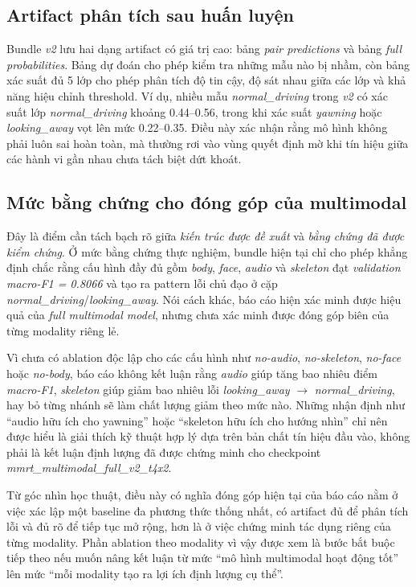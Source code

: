 \documentclass[conference,a4paper]{IEEEtran}
\begin{document}
\subsection{Artifact phân tích sau huấn luyện}
Bundle \textit{v2} lưu hai dạng artifact có giá trị cao: bảng \textit{pair predictions} và bảng \textit{full probabilities}. Bảng dự đoán cho phép kiểm tra những mẫu nào bị nhầm, còn bảng xác suất đủ 5 lớp cho phép phân tích độ tin cậy, độ sát nhau giữa các lớp và khả năng hiệu chỉnh threshold. Ví dụ, nhiều mẫu \textit{normal\_driving} trong \textit{v2} có xác suất lớp \textit{normal\_driving} khoảng 0.44--0.56, trong khi xác suất \textit{yawning} hoặc \textit{looking\_away} vọt lên mức 0.22--0.35. Điều này xác nhận rằng mô hình không phải luôn sai hoàn toàn, mà thường rơi vào vùng quyết định mờ khi tín hiệu giữa các hành vi gần nhau chưa tách biệt dứt khoát.

\subsection{Mức bằng chứng cho đóng góp của multimodal}
Đây là điểm cần tách bạch rõ giữa \textit{kiến trúc được đề xuất} và \textit{bằng chứng đã được kiểm chứng}. Ở mức bằng chứng thực nghiệm, bundle hiện tại chỉ cho phép khẳng định chắc rằng cấu hình đầy đủ gồm \textit{body}, \textit{face}, \textit{audio} và \textit{skeleton} đạt \textit{validation macro-F1 = 0.8066} và tạo ra pattern lỗi chủ đạo ở cặp \textit{normal\_driving}/\textit{looking\_away}. Nói cách khác, báo cáo hiện xác minh được hiệu quả của \textit{full multimodal model}, nhưng chưa xác minh được đóng góp biên của từng modality riêng lẻ.

Vì chưa có ablation độc lập cho các cấu hình như \textit{no-audio}, \textit{no-skeleton}, \textit{no-face} hoặc \textit{no-body}, báo cáo không kết luận rằng \textit{audio} giúp tăng bao nhiêu điểm \textit{macro-F1}, \textit{skeleton} giúp giảm bao nhiêu lỗi \textit{looking\_away} $\rightarrow$ \textit{normal\_driving}, hay bỏ từng nhánh sẽ làm chất lượng giảm theo mức nào. Những nhận định như ``audio hữu ích cho yawning'' hoặc ``skeleton hữu ích cho hướng nhìn'' chỉ nên được hiểu là giải thích kỹ thuật hợp lý dựa trên bản chất tín hiệu đầu vào, không phải là kết luận định lượng đã được chứng minh cho checkpoint \textit{mmrt\_multimodal\_full\_v2\_t4x2}.

Từ góc nhìn học thuật, điều này có nghĩa đóng góp hiện tại của báo cáo nằm ở việc xác lập một baseline đa phương thức thống nhất, có artifact đủ để phân tích lỗi và đủ rõ để tiếp tục mở rộng, hơn là ở việc chứng minh tác dụng riêng của từng modality. Phần ablation theo modality vì vậy được xem là bước bắt buộc tiếp theo nếu muốn nâng kết luận từ mức ``mô hình multimodal hoạt động tốt'' lên mức ``mỗi modality tạo ra lợi ích định lượng cụ thể''.
\end{document}
